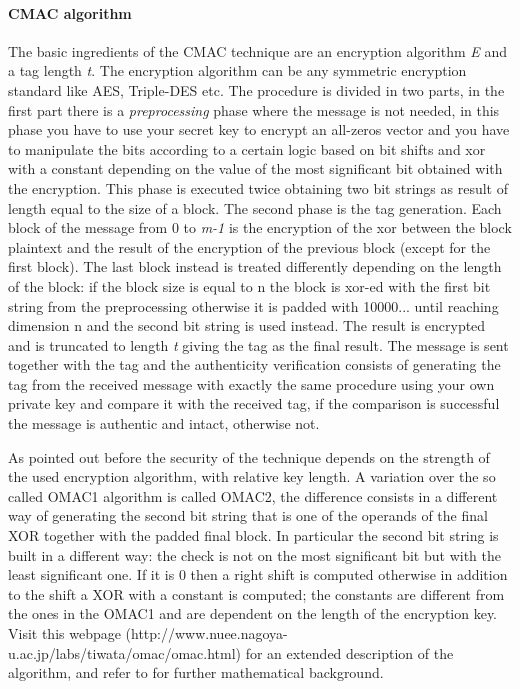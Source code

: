 \documentclass[11pt]{article}
\begin{document}
\paragraph*{CMAC algorithm}
The basic ingredients of the CMAC technique are an encryption algorithm \textit{E} and a tag length \textit{t}. The encryption algorithm can be any symmetric encryption standard like AES, Triple-DES etc.
The procedure is divided in two parts, in the first part there is a \textit{preprocessing} phase where the message is not needed, in this phase you have to use your secret key to encrypt an all-zeros vector and you have to manipulate the bits according to a certain logic based on bit shifts and xor with a constant depending on the value of the most significant bit obtained with the encryption. This phase is executed twice obtaining two bit strings as result of length equal to the size of a block.
The second phase is the tag generation. Each block of the message from 0 to \textit{m-1} is the encryption of the xor between the block plaintext and the result of the encryption of the previous block (except for the first block). The last block instead is treated differently depending on the length of the block: if the block size is equal to n the block is xor-ed with the first bit string from the preprocessing otherwise it is padded with 10000... until reaching dimension n and the second bit string is used instead. The result is encrypted and is truncated to length \textit{t} giving the tag as the final result. The message is sent together with the tag and the authenticity verification consists of generating the tag from the received message with exactly the same procedure using your own private key and compare it with the received tag, if the comparison is successful the message is authentic and intact, otherwise not.

As pointed out before the security of the technique depends on the strength of the used encryption algorithm, with relative key length.
A variation over the so called OMAC1 algorithm is called OMAC2, the difference consists in a different way of generating the second bit string that is one of the operands of the final XOR together with the padded final block. In particular the second bit string is built in a different way: the check is not on the most significant bit but with the least significant one. If it is 0 then a right shift is computed otherwise in addition to the shift a XOR with a constant is computed; the constants are different from the ones in the OMAC1 and are dependent on the length of the encryption key. Visit this webpage (http://www.nuee.nagoya-u.ac.jp/labs/tiwata/omac/omac.html) for an extended description of the algorithm, and refer to \cite{omac} for further mathematical background.
\end{document}
